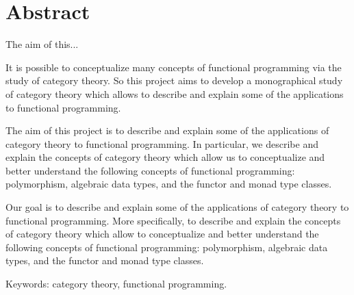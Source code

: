 \chapter{Abstract}


The aim of this... %

It is possible to conceptualize many concepts of functional
programming via the study of category theory. So this project aims to
develop a monographical study of category theory which allows to
describe and explain some of the applications to functional
programming.

The aim of this project is to describe and explain some of the
applications of category theory to functional programming. In
particular, we describe and explain the concepts of category theory
which allow us to conceptualize and better understand the following
concepts of functional programming: polymorphism, algebraic data
types, and the functor and monad type classes.

Our goal is to describe and explain some of the applications of
category theory to functional programming. More specifically, to
describe and explain the concepts of category theory which allow to
conceptualize and better understand the following concepts of
functional programming: polymorphism, algebraic data types, and the
functor and monad type classes.





\vspace{1em}
\noindent
Keywords: category theory, functional programming.

\clearemptydoublepage
